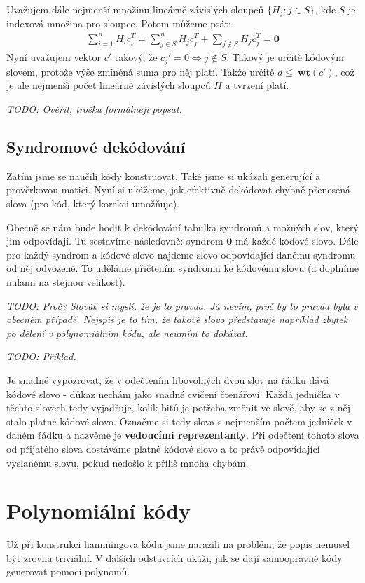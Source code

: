 \documentclass[a4paper,12pt]{article}
\newcommand{\wt}{\ \mathbf{wt}}
\begin{document}
Uvažujem dále nejmenší množinu lineárně závislých sloupců $\{H_j: j \in S\}$, 
kde $S$ je indexová množina pro sloupce. Potom můžeme psát:
\begin{align}
	\sum_{i=1}^n H_i c_i^T = \sum_{j\in S}^n H_j c_j^T + \sum_{j\notin S} H_j 
	c_j^T = \mathbf{0}
\end{align}
Nyní uvažujem vektor $c'$ takový, že $c_j' = 0 \Leftrightarrow j\notin S$.  
Takový je určitě kódovým slovem, protože výše zmíněná suma pro něj platí. Takže 
určitě $d \le \wt(c')$, což je ale nejmenší počet lineárně závislých sloupců $H$ 
a tvrzení platí.

\textit{TODO: Ověřit, trošku formálněji popsat.}

\subsection{Syndromové dekódování}
Zatím jsme se naučili kódy konstruovat. Také jsme si ukázali generující a 
prověrkovou matici. Nyní si ukážeme, jak efektivně dekódovat chybně přenesená 
slova (pro kód, který korekci umožňuje).

Obecně se nám bude hodit k dekódování tabulka syndromů a možných slov, který jim 
odpovídají. Tu sestavíme následovně: syndrom $\mathbf{0}$ má každé kódové slovo.  
Dále pro každý syndrom a kódové slovo najdeme slovo odpovídající danému syndromu 
od něj odvozené. To uděláme přičtením syndromu ke kódovému slovu (a doplníme 
nulami na stejnou velikost). 

\textit{TODO: Proč? Slovák si myslí, že je to pravda. Já nevím, proč by to 
pravda byla v obecném případě. Nejspíš je to tím, že takové slovo představuje 
například zbytek po dělení v polynomiálním kódu, ale neumím to dokázat.}

\textit{TODO: Příklad.}

Je snadné vypozrovat, že v odečtením libovolných dvou slov na řádku dává kódové 
slovo - důkaz nechám jako snadné cvičení čtenářovi. Každá jednička v těchto 
slovech tedy vyjadřuje, kolik bitů je potřeba změnit ve slově, aby se z něj 
stalo platné kódové slovo. Označme si tedy slova s nejmenším počtem jedniček v 
daném řádku a nazvěme je \textbf{vedoucími reprezentanty}. Při odečtení tohoto 
slova od přijatého slova dostáváme platné kódové slovo a to právě odpovídající 
vyslanému slovu, pokud nedošlo k příliš mnoha chybám.

\section{Polynomiální kódy}
Už při konstrukci hammingova kódu jsme narazili na problém, že popis nemusel být 
zrovna triviální. V dalších odstavcích ukáži, jak se dají samoopravné kódy 
generovat pomocí polynomů. 
\end{document}
